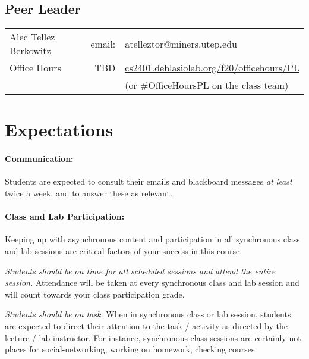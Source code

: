 \documentclass[12pt]{scrartcl}
\newcommand{\change}[2]{#2}
\begin{document}
\subsection{Peer Leader}

\begin{tabular}{lrl}
 Alec Tellez Berkowitz 
 & email: & atelleztor@miners.utep.edu\\
\hspace{2em} Office Hours& TBD & \url{cs2401.deblasiolab.org/f20/officehours/PL}\\
& & (or \#OfficeHoursPL on the class team)\\
\end{tabular}

\section{Expectations}

\paragraph{Communication:} Students are expected to consult their emails and blackboard messages \textit{at least} twice a week, and to answer these as relevant. 

\paragraph{Class and Lab Participation:} \change{Attendance }{Keeping up with asynchronous content} and participation in all \change{lecture}{synchronous class} and lab sessions are critical factors of your success in this course. 

\textit{Students should be on time for all scheduled sessions and attend the entire session.} 
Attendance will be taken at every \change{}{synchronous class and lab} session \change{(at first you will have to sign in but as time goes the instructor will know you and mark you present without your help)} and will count towards your class participation grade. 

\textit{Students should be on task.} 
When in \change{lecture}{synchronous class} or lab session, students are expected to direct their attention to the task / activity as directed by the lecture / lab instructor. 
For instance, \change{lecture and lab}{synchronous class} sessions are certainly not places for social-networking, working on homework, checking courses.
\end{document}
